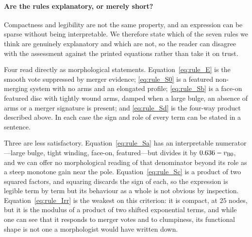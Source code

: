 \documentclass[11pt]{article}
\begin{document}
\begin{table}[htbp]
\centering
\caption{Which Galaxy Zoo decision-tree nodes each class rule draws on,
read mechanically from the expressions in Appendix~\ref{app:rules}. The tree
asks the roundedness question only on the smooth branch and the
winding/bulge/edge-on questions only on the spiral branch; the recovered rules
respect both restrictions. Node T7 (edge-on bulge shape) is used by no rule.
The bar and arm-count entries for Irr are discussed in the text.}
\label{tab:treemap}
\small
\setlength{\tabcolsep}{5pt}

\end{table}

\paragraph{Are the rules explanatory, or merely short?}
Compactness and legibility are not the same property, and an expression can be
sparse without being interpretable. We therefore state which of the seven
rules we think are genuinely explanatory and which are not, so the reader can
disagree with the assessment against the printed equations rather than take it
on trust.

Four read directly as morphological statements. Equation~\eqref{eq:rule_E} is
the smooth vote suppressed by merger evidence; \eqref{eq:rule_S0} is a featured
non-merging system with no arms and an elongated profile;
\eqref{eq:rule_Sb} is a face-on featured disc with tightly wound arms, damped
when a large bulge, an absence of arms or a merger signature is present; and
\eqref{eq:rule_Sd} is the four-way product described above. In each case the
sign and role of every term can be stated in a sentence.

Three are less satisfactory. Equation~\eqref{eq:rule_Sa} has an interpretable
numerator---large bulge, tight winding, face-on, featured---but divides it by
$0.636 - v_{\rm B0}$, and we can offer no morphological reading of that
denominator beyond its role as a steep monotone gain near the pole.
Equation~\eqref{eq:rule_Sc} is a product of two squared factors, and squaring
discards the sign of each, so the expression is legible term by term but its
behaviour as a whole is not obvious by inspection. Equation~\eqref{eq:rule_Irr}
is the weakest on this criterion: it is compact, at $25$ nodes, but it is the
modulus of a product of two shifted exponential terms, and while one can see
that it responds to merger votes and to clumpiness, its functional shape is not
one a morphologist would have written down.
\end{document}
